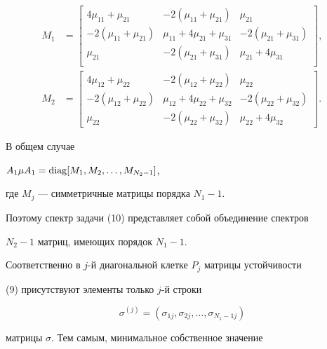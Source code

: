 \begin{align*}


M_{1}&=


\begin{bmatrix}


4\mu_{11}+\mu_{21}&-2(\mu_{11}+\mu_{21})&\mu_{21}\\


-2(\mu_{11}+\mu_{21})&\mu_{11}+4\mu_{21}+\mu_{31}&-2(\mu_{21}+\mu_{31})\\


\mu_{21}&-2(\mu_{21}+\mu_{31})&\mu_{21}+4\mu_{31}\\


\end{bmatrix}


, \\


%


M_{2}&=


\begin{bmatrix}


4\mu_{12}+\mu_{22}&-2(\mu_{12}+\mu_{22})&\mu_{22} \\


-2(\mu_{12}+\mu_{22}) &\mu_{12}+4\mu_{22}+\mu_{32} &-2(\mu_{22}+\mu_{32}) \\


\mu_{22} &-2(\mu_{22}+\mu_{32}) & \mu_{22}+4\mu_{32}


\end{bmatrix}


.


\end{align*}





В общем случае


$A_{1}\mu A_{1}=\operatorname{diag} [M_1,M_2, \dotsc ,M_{N_{2}-1}]$,


где $M_j$ --- симметричные матрицы порядка $N_{1}-1$.


Поэтому спектр задачи (10) представляет собой объединение спектров


$N_{2}-1$ матриц, имеющих порядок $N_{1}-1$.


Соответственно в $j$-й диагональной клетке $P_{j}$ матрицы устойчивости


(9) присутствуют элементы только $j$-й строки


$$


\sigma^{(j)}=(\sigma_{1j},\sigma_{2j},\dotsc ,\sigma_{N_{1}-1j})


$$


матрицы $\sigma$. Тем самым, минимальное собственное значение


